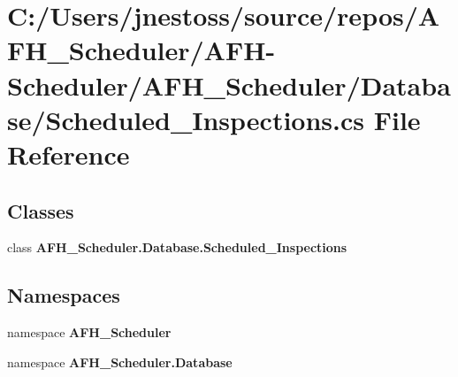 \section{C\+:/\+Users/jnestoss/source/repos/\+A\+F\+H\+\_\+\+Scheduler/\+A\+F\+H-\/\+Scheduler/\+A\+F\+H\+\_\+\+Scheduler/\+Database/\+Scheduled\+\_\+\+Inspections.cs File Reference}
\label{_scheduled___inspections_8cs}
\subsection*{Classes}
\begin{DoxyCompactItemize}
\item 
class \textbf{ A\+F\+H\+\_\+\+Scheduler.\+Database.\+Scheduled\+\_\+\+Inspections}
\end{DoxyCompactItemize}
\subsection*{Namespaces}
\begin{DoxyCompactItemize}
\item 
namespace \textbf{ A\+F\+H\+\_\+\+Scheduler}
\item 
namespace \textbf{ A\+F\+H\+\_\+\+Scheduler.\+Database}
\end{DoxyCompactItemize}
